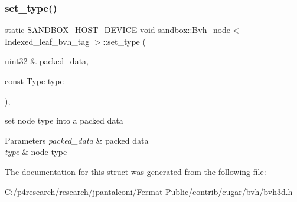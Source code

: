 \subsubsection{\texorpdfstring{set\+\_\+type()}{set\_type()}\hspace{0.1cm}{\footnotesize\ttfamily [2/2]}}
{\footnotesize\ttfamily static S\+A\+N\+D\+B\+O\+X\+\_\+\+H\+O\+S\+T\+\_\+\+D\+E\+V\+I\+CE void \hyperlink{structsandbox_1_1_bvh__node}{sandbox\+::\+Bvh\+\_\+node}$<$ Indexed\+\_\+leaf\+\_\+bvh\+\_\+tag $>$\+::set\+\_\+type (\begin{DoxyParamCaption}\item[{uint32 \&}]{packed\+\_\+data,  }\item[{const Type}]{type }\end{DoxyParamCaption})\hspace{0.3cm}{\ttfamily [inline]}, {\ttfamily [static]}}

set node type into a packed data


\begin{DoxyParams}{Parameters}
{\em packed\+\_\+data} & packed data \\
\hline
{\em type} & node type \\
\hline
\end{DoxyParams}


The documentation for this struct was generated from the following file\+:\begin{DoxyCompactItemize}
\item 
C\+:/p4research/research/jpantaleoni/\+Fermat-\/\+Public/contrib/cugar/bvh/bvh3d.\+h\end{DoxyCompactItemize}
